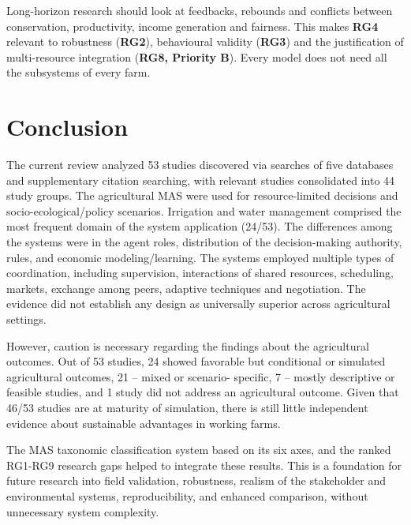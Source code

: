 \documentclass[11pt,a4paper]{article}
\begin{document}
Long-horizon research should look at feedbacks, rebounds and conflicts
between conservation, productivity, income generation and fairness. This makes
\textbf{RG4} relevant to robustness (\textbf{RG2}), behavioural validity
(\textbf{RG3}) and the justification of multi-resource integration
(\textbf{RG8, Priority B}). Every model does not need all the subsystems of every farm.




\section{Conclusion}

The current review analyzed 53 studies discovered via searches
of five databases and supplementary citation searching, with relevant
studies consolidated into 44 study groups. The agricultural MAS
were used for resource-limited decisions and socio-ecological/policy
scenarios. Irrigation and water management comprised the most
frequent domain of the system application (24/53). The differences
among the systems were in the agent roles, distribution of
the decision-making authority, rules, and economic modeling/learning.
The systems employed multiple types of coordination, including
supervision, interactions of shared resources, scheduling, markets,
exchange among peers, adaptive techniques and negotiation. The evidence did not establish any design as universally superior across agricultural settings.

However, caution is necessary regarding the findings about
the agricultural outcomes. Out of 53 studies, 24 showed favorable but
conditional or simulated agricultural outcomes, 21 – mixed or scenario-
specific, 7 – mostly descriptive or feasible studies, and 1 study
did not address an agricultural outcome. Given that 46/53 studies
are at maturity of simulation, there is still little independent evidence
about sustainable advantages in working farms.

The MAS taxonomic classification system based on its six axes, and the ranked RG1-RG9 research gaps helped to integrate these results. This is a foundation for future research into field validation, robustness, realism of the stakeholder and environmental systems, reproducibility, and enhanced comparison, without unnecessary system complexity.
\end{document}
